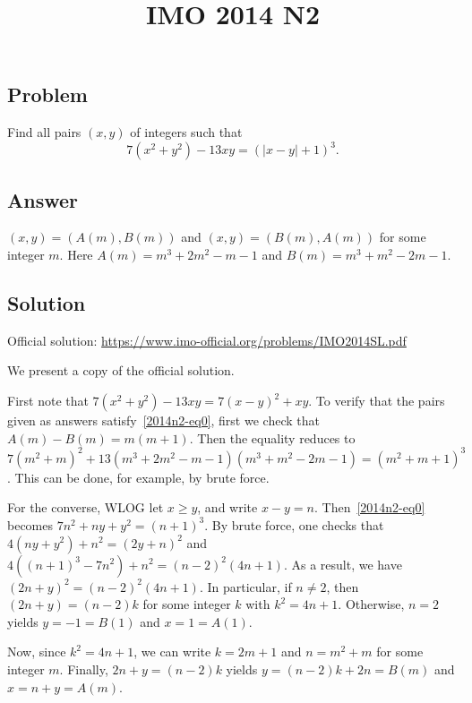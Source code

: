 \documentclass{article}
\title{IMO 2014 N2}
\author{}
\date{}
\begin{document}
\maketitle



\subsection*{Problem}

Find all pairs $(x, y)$ of integers such that
\[ 7 (x^2 + y^2) - 13 xy = (|x - y| + 1)^3. \tag{*}\label{2014n2-eq0} \]



\subsection*{Answer}

$(x, y) = (A(m), B(m))$ and $(x, y) = (B(m), A(m))$ for some integer $m$.
Here $A(m) = m^3 + 2m^2 - m - 1$ and $B(m) = m^3 + m^2 - 2m - 1$.



\subsection*{Solution}

Official solution: \url{https://www.imo-official.org/problems/IMO2014SL.pdf}

We present a copy of the official solution.

First note that $7 (x^2 + y^2) - 13 xy = 7 (x - y)^2 + xy$.
To verify that the pairs given as answers satisfy~\eqref{2014n2-eq0}, first we check that $A(m) - B(m) = m(m + 1)$.
Then the equality reduces to $7(m^2 + m)^2 + 13(m^3 + 2m^2 - m - 1)(m^3 + m^2 - 2m - 1) = (m^2 + m + 1)^3$.
This can be done, for example, by brute force.

For the converse, WLOG let $x \geq y$, and write $x - y = n$.
Then~\eqref{2014n2-eq0} becomes $7n^2 + ny + y^2 = (n + 1)^3$.
By brute force, one checks that $4(ny + y^2) + n^2 = (2y + n)^2$ and $4((n + 1)^3 - 7n^2) + n^2 = (n - 2)^2 (4n + 1)$.
As a result, we have $(2n + y)^2 = (n - 2)^2 (4n + 1)$.
In particular, if $n \neq 2$, then $(2n + y) = (n - 2) k$ for some integer $k$ with $k^2 = 4n + 1$.
Otherwise, $n = 2$ yields $y = -1 = B(1)$ and $x = 1 = A(1)$.

Now, since $k^2 = 4n + 1$, we can write $k = 2m + 1$ and $n = m^2 + m$ for some integer $m$.
Finally, $2n + y = (n - 2) k$ yields $y = (n - 2) k + 2n = B(m)$ and $x = n + y = A(m)$.
\end{document}
